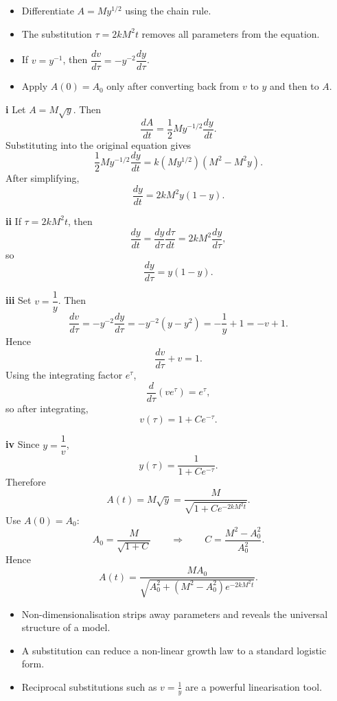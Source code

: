 \begin{hint}
\begin{itemize}[leftmargin=*]
    \item Differentiate $A=My^{1/2}$ using the chain rule.
    \item The substitution $\tau=2kM^2t$ removes all parameters from the equation.
    \item If $v=y^{-1}$, then $\dfrac{dv}{d\tau}=-y^{-2}\dfrac{dy}{d\tau}$.
    \item Apply $A(0)=A_0$ only after converting back from $v$ to $y$ and then to $A$.
\end{itemize}
\end{hint}

\begin{solution}
\textbf{i} Let $A=M\sqrt{y}$. Then
\[
\frac{dA}{dt}=\frac12My^{-1/2}\frac{dy}{dt}.
\]
Substituting into the original equation gives
\[
\frac12My^{-1/2}\frac{dy}{dt}=k(My^{1/2})(M^2-M^2y).
\]
After simplifying,
\[
\boxed{\frac{dy}{dt}=2kM^2y(1-y).}
\]

\textbf{ii} If $\tau=2kM^2t$, then
\[
\frac{dy}{dt}=\frac{dy}{d\tau}\frac{d\tau}{dt}=2kM^2\frac{dy}{d\tau},
\]
so
\[
\boxed{\frac{dy}{d\tau}=y(1-y).}
\]

\textbf{iii} Set $v=\dfrac1y$. Then
\[
\frac{dv}{d\tau}=-y^{-2}\frac{dy}{d\tau}=-y^{-2}(y-y^2)=-\frac1y+1=-v+1.
\]
Hence
\[
\frac{dv}{d\tau}+v=1.
\]
Using the integrating factor $e^\tau$,
\[
\frac{d}{d\tau}(ve^\tau)=e^\tau,
\]
so after integrating,
\[
\boxed{v(\tau)=1+Ce^{-\tau}.}
\]

\textbf{iv} Since $y=\dfrac1v$,
\[
y(\tau)=\frac{1}{1+Ce^{-\tau}}.
\]
Therefore
\[
A(t)=M\sqrt{y}=\frac{M}{\sqrt{1+Ce^{-2kM^2t}}}.
\]
Use $A(0)=A_0$:
\[
A_0=\frac{M}{\sqrt{1+C}}
\qquad \Longrightarrow \qquad
C=\frac{M^2-A_0^2}{A_0^2}.
\]
Hence
\[
\boxed{
A(t)=\frac{MA_0}{\sqrt{A_0^2+(M^2-A_0^2)e^{-2kM^2t}}}.
}
\]
\end{solution}

\begin{takeaways}
\begin{itemize}[leftmargin=*]
    \item Non-dimensionalisation strips away parameters and reveals the universal structure of a model.
    \item A substitution can reduce a non-linear growth law to a standard logistic form.
    \item Reciprocal substitutions such as $v=\frac1y$ are a powerful linearisation tool.
\end{itemize}
\end{takeaways}

